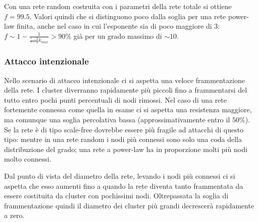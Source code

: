 Con una rete random costruita con i parametri della rete totale si ottiene $f = 99.5$. Valori quindi che si distinguono poco dalla soglia per una rete power-law finita, anche nel caso in cui l'esponente sia di poco maggiore di 3: $f \sim 1 - \frac{1}{\frac{\gamma - 2}{\gamma-3}k_{max}} > 90\%$ già per un grado massimo di $\sim10$.


\subsubsection{Attacco intenzionale}
Nello scenario di attacco intenzionale ci si aspetta una veloce frammentazione della rete. I cluster diverranno rapidamente più piccoli fino a frammentarsi del tutto entro pochi punti percentuali di nodi rimossi. Nel caso di una rete fortemente connessa come quella in esame ci si aspetta una resistenza maggiore, ma comunque una soglia percolativa bassa (approssimativamente entro il $50\%$). Se la rete è di tipo scale-free dovrebbe essere più fragile ad attacchi di questo tipo: mentre in una rete random i nodi più connessi sono solo una coda della distribuzione del grado; una rete a power-law ha in proporzione molti più nodi molto connessi.

Dal punto di vista del diametro della rete, levando i nodi più connessi ci si aspetta che esso aumenti fino a quando la rete diventa tanto frammentata da essere costituita da cluster con pochissimi nodi. Oltrepassata la soglia di frammentazione quindi il diametro dei cluster più grandi decrescerà rapidamente a zero.
\clearpage

